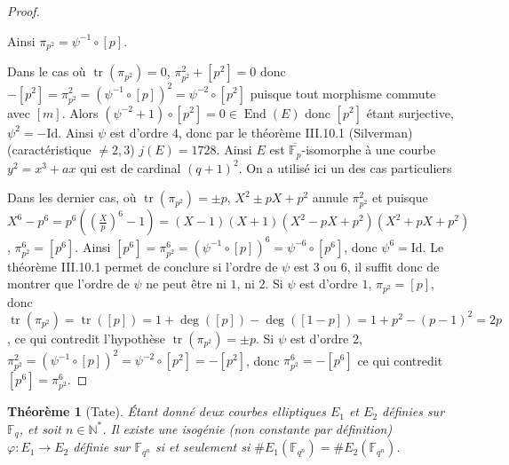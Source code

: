 \documentclass{article}
\theoremstyle{plain}%
\newtheorem{thm}{Théorème}[section]
\theoremstyle{definition}%
\newcommand{\F}{\mathbb{F}}
\newcommand{\N}{\mathbb{N}}
\newcommand{\h}{\widehat}
\DeclareMathOperator{\End}{End}
\DeclareMathOperator{\tr}{tr}
\begin{document}
\begin{proof}
\begin{center}
\end{center}

Ainsi $\pi_{p^2} = \psi^{-1} \circ [p]$.

\vspace{1em}
Dans le cas où $\tr(\pi_{p^2}) = 0$, $\pi_{p^2}^2 + [p^2] = 0$ donc $-[p^2] = \pi_{p^2}^2 = (\psi^{-1} \circ [p])^2 = \psi^{-2} \circ [p^2]$ puisque tout morphisme commute avec $[m]$. Alors $(\psi^{-2} +1)\circ [p^2] = 0\in \End(E)$ donc $[p^2]$ étant surjective, $\psi^2 = -\text{Id}$.
Ainsi $\psi$ est d'ordre $4$, donc par le théorème III.10.1 (Silverman) (caractéristique $\neq 2, 3$) $j(E) = 1728$.
Ainsi $E$ est $\overline{\F_p}$-isomorphe à une courbe $y^2=x^3 + ax$ qui est de cardinal $(q+1)^2$. On a utilisé ici un des cas particuliers 

\vspace{1em}
Dans les dernier cas, où $\tr(\pi_{p^2}) = \pm p$, $X^2 \pm p X +p^2$ annule $\pi_{p^2}^2$ et puisque $X^6 - p^6 = p^6 ((\frac{X}{p})^6 - 1) = (X-1)(X+1)(X^2 -pX + p^2)(X^2 + pX + p^2)$, $\pi_{p^2}^6 = [p^6]$. Ainsi $[p^6] = \pi_{p^2}^6  = (\psi^{-1} \circ [p])^6 = \psi^{-6} \circ [p^6]$, donc $\psi^6 = \text{Id}$. Le théorème III.10.1 permet de conclure si l'ordre de $\psi$ est $3$ ou $6$, il suffit donc de montrer que l'ordre de $\psi$ ne peut être ni $1$, ni $2$.
Si $\psi$ est d'ordre $1$, $\pi_{p^2} = [p]$, donc $\tr(\pi_{p^2}) = \tr([p]) = 1 + \deg([p]) - \deg([1-p]) = 1 + p^2 -(p-1)^2 = 2p$, ce qui contredit l'hypothèse $\tr(\pi_{p^2}) = \pm p$. 
Si $\psi$ est d'ordre $2$, $\pi_{p^2}^2 = (\psi^{-1} \circ [p])^2 = \psi^{-2} \circ [p^2] = - [p^2]$, donc $\pi_{p^2}^6 = -[p^6]$ ce qui contredit $[p^6] = \pi_{p^2}^6$. 
\end{proof}

\begin{thm}[Tate]
  \label{tate}
Étant donné deux courbes elliptiques $E_1$ et $E_2$ définies sur $\F_{q}$, et soit $n\in\N^*$. Il existe une isogénie (non constante par définition) $\varphi : E_1 \to E_2$ définie sur $\F_{q^n}$ si et seulement si $\# E_1(\F_{q^n}) = \# E_2(\F_{q^n})$. 
\end{thm}
\end{document}
